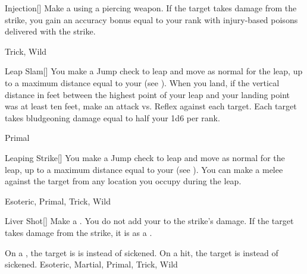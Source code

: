 \lowercase{\hypertarget{maneuver:Injection}{}}\label{maneuver:Injection}
\hypertarget{maneuver:Injection}{}
\begin{freeability}[Rank 3]{Injection}[]
Make a  using a piercing weapon.
If the target takes damage from the strike, you gain an accuracy bonus equal to your rank with injury-based poisons delivered with the strike.


 Trick, Wild
\end{freeability}
\vspace{0.25em}



\lowercase{\hypertarget{maneuver:Leap Slam}{}}\label{maneuver:Leap Slam}
\hypertarget{maneuver:Leap Slam}{}
\begin{freeability}[Rank 3]{Leap Slam}[]
You make a Jump check to leap and move as normal for the leap, up to a maximum distance equal to your  (see ).
When you land, if the vertical distance in feet between the highest point of your leap and your landing point was at least ten feet, make an attack vs. Reflex against each target.
\hit Each target takes bludgeoning damage equal to half your  \add 1d6 per rank.


 Primal
\end{freeability}
\vspace{0.25em}



\lowercase{\hypertarget{maneuver:Leaping Strike}{}}\label{maneuver:Leaping Strike}
\hypertarget{maneuver:Leaping Strike}{}
\begin{freeability}[Rank 3]{Leaping Strike}[]
You make a Jump check to leap and move as normal for the leap, up to a maximum distance equal to your  (see ).
You can make a melee  against the target from any location you occupy during the leap.


 Esoteric, Primal, Trick, Wild
\end{freeability}
\vspace{0.25em}



\lowercase{\hypertarget{maneuver:Liver Shot}{}}\label{maneuver:Liver Shot}
\hypertarget{maneuver:Liver Shot}{}
\begin{freeability}[Rank 3]{Liver Shot}[]
Make a .
You do not add your  to the strike's damage.
If the target takes damage from the strike, it is  as a .

\rankline
{} On a , the target is is  instead of sickened.
 On a hit, the target is  instead of sickened.
 Esoteric, Martial, Primal, Trick, Wild
\end{freeability}
\vspace{0.25em}



